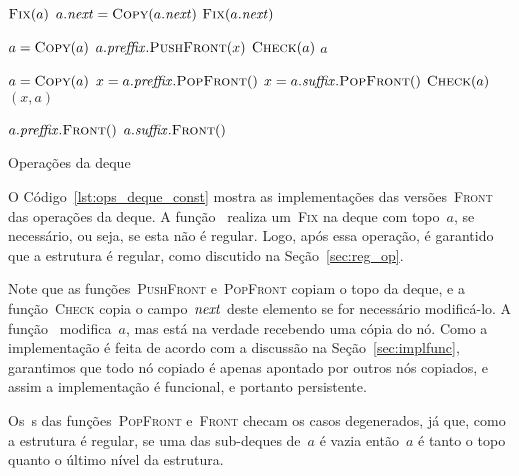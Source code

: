 \documentclass[../../main.tex]{subfiles}
\begin{document}
\begin{algorithm}
\begin{algorithmic}[1]

        \State $\Call{Fix}{a}$
        \State $a.\V{next} = \Call{Copy}{a.\V{next}}$
        \State $\Call{Fix}{a.\V{next}}$
    \EndIf
\EndFunction

    \State $a = \Call{Copy}{a}$
    \State $a.\V{preffix}.\Call{PushFront}{x}$
    \State $\Call{Check}{a}$
    \State \Return $a$
\EndFunction

    \State $a = \Call{Copy}{a}$
        \State $x = a.\V{preffix}.\Call{PopFront}{\null}$
    \Else
        \State $x = a.\V{suffix}.\Call{PopFront}{\null}$
    \EndIf
    \State $\Call{Check}{a}$
    \State \Return $(x, a)$
\EndFunction

        \State \Return $a.\V{preffix}.\Call{Front}{\null}$
    \Else
        \State \Return $a.\V{suffix}.\Call{Front}{\null}$
    \EndIf
\EndFunction

\end{algorithmic}
\caption{Operações da deque} \label{lst:ops_deque_const}
\end{algorithm}

O Código~\ref{lst:ops_deque_const} mostra as implementações das versões~\textsc{Front} das operações da deque. A função~ realiza um~\textsc{Fix} na deque com topo~$a$, se necessário, ou seja, se esta não é regular. Logo, após essa operação, é garantido que a estrutura é regular, como discutido na Seção~\ref{sec:reg_op}.

Note que as funções~\textsc{PushFront} e~\textsc{PopFront} copiam o topo da deque, e a função~\textsc{Check} copia o campo~$\mathit{next}$ deste elemento se for necessário modificá-lo. A função~ modifica~$a$, mas está na verdade recebendo uma cópia do nó. Como a implementação é feita de acordo com a discussão na Seção~\ref{sec:implfunc}, garantimos que todo nó copiado é apenas apontado por outros nós copiados, e assim a implementação é funcional, e portanto persistente.


Os~s das funções~\textsc{PopFront} e~\textsc{Front} checam os casos degenerados, já que, como a estrutura é regular, se uma das sub-deques de~$a$ é vazia então~$a$ é tanto o topo quanto o último nível da estrutura.
\end{document}
